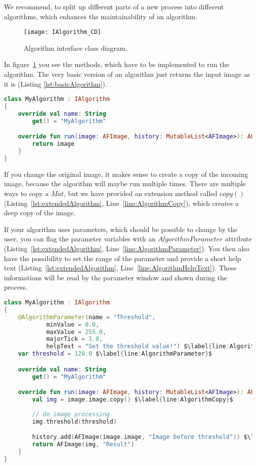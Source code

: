 We recommend, to split up different parts of a new process into different algorithms, which enhances the maintainability of an algorithm.

\begin{figure}[h]
  \centering
      \texttt{[image: IAlgorithm\_CD]}
  \caption{Algorithm interface class diagram.}
  \label{fig:IAlgorithm_CD_DG}
\end{figure}

In figure~\ref{fig:IAlgorithm_CD_DG} you see the methods, which have to be implemented to run the algorithm. The very basic version of an algorithm just returns the input image as it is (Listing \ref{lst:basicAlgorithm}).

\begin{lstlisting}[caption={Basic version of an algorithm.}, label={lst:basicAlgorithm}, language=Kotlin]
class MyAlgorithm : IAlgorithm
{
    override val name: String
        get() = "MyAlgorithm"

    override fun run(image: AFImage, history: MutableList<AFImage>): AFImage {
        return image
    }
}
\end{lstlisting}

If you change the original image, it makes sense to create a copy of the incoming image, because the algorithm will maybe run multiple times. There are multiple ways to copy a $Mat$, but we have provided an extension method called $copy()$ (Listing~\ref{lst:extendedAlgorithm}, Line~\ref{line:AlgorithmCopy}), which creates a deep copy of the image.

If your algorithm uses parameters, which should be possible to change by the user, you can flag the parameter variables with an $AlgorithmParameter$ attribute (Listing~\ref{lst:extendedAlgorithm}, Line~\ref{line:AlgorithmParameter}). You then also have the possibility to set the range of the parameter and provide a short help text (Listing~\ref{lst:extendedAlgorithm}, Line~\ref{line:AlgorithmHelpText}). These informations will be read by the parameter window and shown during the process.

\begin{lstlisting}[caption={Extended version of an algorithm.}, label={lst:extendedAlgorithm}, language=Kotlin, escapechar=$]
class MyAlgorithm : IAlgorithm
{
    @AlgorithmParameter(name = "Threshold",
            minValue = 0.0,
            maxValue = 255.0,
            majorTick = 1.0,
            helpText = "Set the threshold value!") $\label{line:AlgorithmHelpText}$
    var threshold = 128.0 $\label{line:AlgorithmParameter}$

    override val name: String
        get() = "MyAlgorithm"

    override fun run(image: AFImage, history: MutableList<AFImage>): AFImage {
        val img = image.image.copy() $\label{line:AlgorithmCopy}$
        
        // do image processing
        img.threshold(threshold)

        history.add(AFImage(image.image, "Image before threshold")) $\label{line:AlgorithmHistory}$
        return AFImage(img, "Result")
    }
}
\end{lstlisting}

